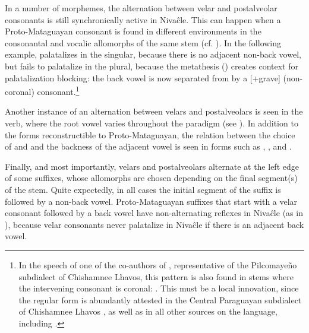 \begin{exe}
    \ex \finger
    \ex \truev
    \ex \ocelot
    \ex \arrowkaxe
    \ex \armadillonomaka
    \ex \sleepiness
    \ex \carrysh
    \ex \palocruzmn
    \ex \eatvt
    \ex \aunt
    \ex \uncle
    \ex \tuscaf
    \ex \tuscat
    \ex \tuscag
    \ex \skin
    \ex \teach \label{ni-x-teach}
\end{exe}

In a number of morphemes, the alternation between velar and postalveolar consonants is still synchronically active in Nivaĉle. This can happen when a Proto-Mataguayan consonant is found in different environments in the consonantal and vocalic allomorphs of the same stem (cf. ). In the following example,  palatalizes in the singular, because there is no adjacent non-back vowel, but fails to palatalize in the plural, because the metathesis () creates context for palatalization blocking: the back vowel  is now separated from  by a [+grave] (non-coronal) consonant.\footnote{In the speech of one of the co-authors of \citet{LC20}, representative of the Pilcomayeño subdialect of Chishamnee Lhavos, this pattern is also found in stems where the intervening consonant is coronal: . This must be a local innovation, since the regular form  is abundantly attested in the Central Paraguayan subdialect of Chishamnee Lhavos \citep[10]{LC20}, as well as in all other sources on the language, including \citet{NS87,AF16,JS16}.}

\begin{exe}
    \ex \abdcavity
\end{exe}

Another instance of an alternation between velars and postalveolars is seen in the verb, where the root vowel varies throughout the paradigm (see ). In addition to the forms reconstructible to Proto-Mataguayan, the relation between the choice of  and  and the backness of the adjacent vowel is seen in forms such as , ,
and  \citep[146]{AF16}.

\begin{exe}
    \ex \goaway
\end{exe}

Finally, and most importantly, velars and postalveolars alternate at the left edge of some suffixes, whose allomorphs are chosen depending on the final segment(s) of the stem. Quite expectedly, in all cases the initial segment of the suffix is followed by a non-back vowel. Proto-Mataguayan suffixes that start with a velar consonant followed by a back vowel have non-alternating reflexes in Nivaĉle (as in ), because velar consonants never palatalize in Nivaĉle if there is an adjacent back vowel.

